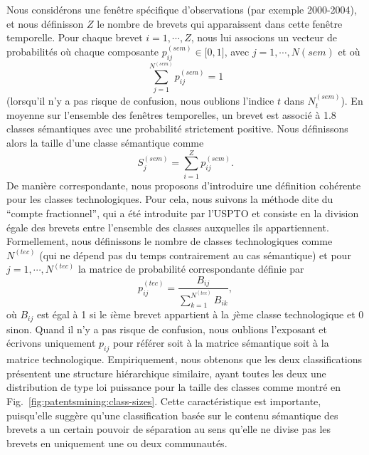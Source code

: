 {Nous considérons une fenêtre spécifique d'observations (par exemple 2000-2004), et nous définisson $Z$ le nombre de brevets qui apparaissent dans cette fenêtre temporelle. Pour chaque brevet $i=1, \cdots, Z$, nous lui associons un vecteur de probabilités où chaque composante $p_{ij}^{(sem)} \in \big[ 0,1 \big]$, avec $j = 1, \cdots, N{(sem)}$ et où $$\displaystyle \sum_{j=1}^{N^{(sem)}} p_{ij}^{(sem)} = 1$$ (lorsqu'il n'y a pas risque de confusion, nous oublions l'indice $t$ dans $N_t^{(sem)}$). En moyenne sur l'ensemble des fenêtres temporelles, un brevet est associé à 1.8 classes sémantiques avec une probabilité strictement positive. Nous définissons alors la taille d'une classe sémantique comme $$S_j^{(sem)} = \displaystyle \sum_{i=1}^Z p_{ij}^{(sem)}.$$ De manière correspondante, nous proposons d'introduire une définition cohérente pour les classes technologiques. Pour cela, nous suivons la méthode dite du ``compte fractionnel'', qui a été introduite par l'USPTO et consiste en la division égale des brevets entre l'ensemble des classes auxquelles ils appartiennent. Formellement, nous définissons le nombre de classes technologiques comme $N^{(tec)}$ (qui ne dépend pas du temps contrairement au cas sémantique) et pour $j = 1, \cdots, N^{(tec)}$ la matrice de probabilité correspondante définie par
\[
 p_{ij}^{(tec)} = \frac{B_{ij}}{\displaystyle \sum_{k=1}^{N^{(tec)}}{B_{ik}}},
\]
où $B_{ij}$ est égal à 1 si le $i$ème brevet appartient à la $j$ème classe technologique et 0 sinon. Quand il n'y a pas risque de confusion, nous oublions l'exposant et écrivons uniquement $p_{ij}$ pour référer soit à la matrice sémantique soit à la matrice technologique. Empiriquement, nous obtenons que les deux classifications présentent une structure hiérarchique similaire, ayant toutes les deux une distribution de type loi puissance pour la taille des classes comme montré en Fig.~\ref{fig:patentsmining:class-sizes}. Cette caractéristique est importante, puisqu'elle suggère qu'une classification basée sur le contenu sémantique des brevets a un certain pouvoir de séparation au sens qu'elle ne divise pas les brevets en uniquement une ou deux communautés.
}



